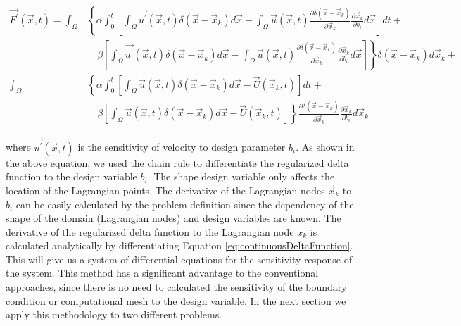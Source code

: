 \documentclass[12pt]{aiaa-pretty}
\begin{document}
%
\begin{equation}
\begin{aligned}\label{eq:forceingFunctionDerivative}
	\vec{F^\prime}(\vec{x}, t) = 
	\int_\Omega 
	&\left\{
 	\alpha \int_0^t
	\left[
	\int_\Omega \vec{u^\prime} (\vec{x}, t) \delta(\vec{x} - \vec{x}_k) d\vec{x} - 
	\int_\Omega \vec{u} (\vec{x}, t) \frac{\partial \delta(\vec{x} - \vec{x}_k)}{\partial \vec{x}_k} \frac{\partial \vec{x}_k}{\partial b_i} d\vec{x}
	\right]dt + \right. \\
	&\left.
	\quad \beta
	\left[
	\int_\Omega \vec{u^\prime} (\vec{x}, t) \delta(\vec{x} - \vec{x}_k) d\vec{x} - 
	\int_\Omega \vec{u} (\vec{x}, t) \frac{\partial \delta(\vec{x} - \vec{x}_k)}{\partial \vec{x}_k} \frac{\partial \vec{x}_k}{\partial b_i} d\vec{x}
	\right]
	\right\} \delta(\vec{x} - \vec{x}_k) d\vec{x}_k + \\
	\int_\Omega 
	&\left\{
 	\alpha \int_0^t
	\left[
	\int_\Omega \vec{u} (\vec{x}, t) \delta(\vec{x} - \vec{x}_k) d\vec{x} - \vec{U}\left( \vec{x}_k, t \right)
	\right]dt + \right. \\
	&\left.
	\quad \beta \left[
	\int_\Omega \vec{u} (\vec{x}, t) \delta(\vec{x} - \vec{x}_k) d\vec{x} - \vec{U}\left( \vec{x}_k, t \right)
	\right]
	\right\} \frac{\partial \delta(\vec{x} - \vec{x}_k)}{\partial \vec{x}_k} \frac{\partial \vec{x}_k}{\partial b_i} d\vec{x}_k
\end{aligned}
\end{equation}
%

where $\vec{u^\prime}\left( \vec{x}, t \right)$ is the sensitivity of velocity to design parameter $b_i$. As shown in the above equation, we used the chain rule to differentiate the regularized delta function to the design variable $b_i$. The shape design variable only affects the location of the Lagrangian points. The derivative of the Lagrangian nodes $\vec{x}_k$ to $b_i$ can be easily calculated by the problem definition since the dependency of the shape of the domain (Lagrangian nodes) and design variables are known. The derivative of the regularized delta function to the Lagrangian node $x_k$ is calculated analytically by differentiating Equation \eqref{eq:continuousDeltaFunction}. This will give us a system of differential equations for the sensitivity response of the system. This method has a significant advantage to the conventional approaches, since there is no need to calculated the sensitivity of the boundary condition or computational mesh to the design variable. In the next section we apply this methodology to two different problems.
\end{document}

